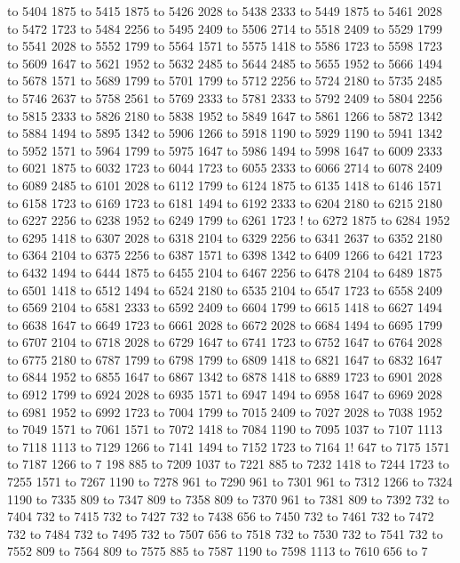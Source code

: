  to 5404 1875 to 5415 1875 to 5426 2028 to 5438 2333 to 5449 1875 to 5461 2028 to 5472 1723 to 5484 2256 to 5495 2409 to 5506 2714 to 5518 2409 to 5529 1799 to 5541 2028 to 5552 1799 to 5564 1571 to 5575 1418 to 5586 1723 to 5598 1723 to 5609 1647 to 5621 1952 to 5632 2485 to 5644 2485 to 5655 1952 to 5666 1494 to 5678 1571 to 5689 1799 to 5701 1799 to 5712 2256 to 5724 2180 to 5735 2485 to 5746 2637 to 5758 2561 to 5769 2333 to 5781 2333 to 5792 2409 to 5804 2256 to 5815 2333 to 5826 2180 to 5838 1952 to 5849 1647 to 5861 1266 to 5872 1342 to 5884 1494 to 5895 1342 to 5906 1266 to 5918 1190 to 5929 1190 to 5941 1342 to 5952 1571 to 5964 1799 to 5975 1647 to 5986 1494 to 5998 1647 to 6009 2333 to 6021 1875 to 6032 1723 to 6044 1723 to 6055 2333 to 6066 2714 to 6078 2409 to 6089 2485 to 6101 2028 to 6112 1799 to 6124 1875 to 6135 1418 to 6146 1571 to 6158 1723 to 6169 1723 to 6181 1494 to 6192 2333 to 6204 2180 to 6215 2180 to 6227 2256 to 6238 1952 to 6249 1799 to 6261 1723 !
to 6272 1875 to 6284 1952 to 6295 
1418 to 6307 2028 to 6318 2104 to 6329 2256 to 6341 2637 to 6352 2180 to 6364 2104 to 6375 2256 to 6387 1571 to 6398 1342 to 6409 1266 to 6421 1723 to 6432 1494 to 6444 1875 to 6455 2104 to 6467 2256 to 6478 2104 to 6489 1875 to 6501 1418 to 6512 1494 to 6524 2180 to 6535 2104 to 6547 1723 to 6558 2409 to 6569 2104 to 6581 2333 to 6592 2409 to 6604 1799 to 6615 1418 to 6627 1494 to 6638 1647 to 6649 1723 to 6661 2028 to 6672 2028 to 6684 1494 to 6695 1799 to 6707 2104 to 6718 2028 to 6729 1647 to 6741 1723 to 6752 1647 to 6764 2028 to 6775 2180 to 6787 1799 to 6798 1799 to 6809 1418 to 6821 1647 to 6832 1647 to 6844 1952 to 6855 1647 to 6867 1342 to 6878 1418 to 6889 1723 to 6901 2028 to 6912 1799 to 6924 2028 to 6935 1571 to 6947 1494 to 6958 1647 to 6969 2028 to 6981 1952 to 6992 1723 to 7004 1799 to 7015 2409 to 7027 2028 to 7038 1952 to 7049 1571 to 7061 1571 to 7072 1418 to 7084 1190 to 7095 1037 to 7107 1113 to 7118 1113 to 7129 1266 to 7141 1494 to 7152 1723 to 7164 1!
647 to 7175 1571 to 7187 1266 to 7
198 885 to 7209 1037 to 7221 885 to 7232 1418 to 7244 1723 to 7255 1571 to 7267 1190 to 7278 961 to 7290 961 to 7301 961 to 7312 1266 to 7324 1190 to 7335 809 to 7347 809 to 7358 809 to 7370 961 to 7381 809 to 7392 732 to 7404 732 to 7415 732 to 7427 732 to 7438 656 to 7450 732 to 7461 732 to 7472 732 to 7484 732 to 7495 732 to 7507 656 to 7518 732 to 7530 732 to 7541 732 to 7552 809 to 7564 809 to 7575 885 to 7587 1190 to 7598 1113 to 7610 656 to 7
